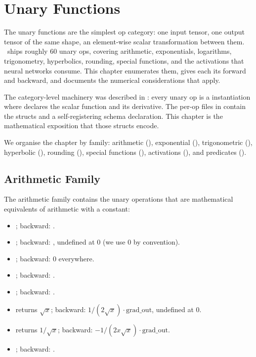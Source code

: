 \chapter{Unary Functions}
\label{ch:unary_functions}

The unary functions are the simplest op category: one input tensor,
one output tensor of the same shape, an element-wise scalar
transformation between them. \Lucid\ ships roughly 60 unary ops,
covering arithmetic, exponentials, logarithms, trigonometry,
hyperbolics, rounding, special functions, and the activations that
neural networks consume. This chapter enumerates them, gives each
its forward and backward, and documents the numerical
considerations that apply.

The category-level machinery was described in
: every unary op is a
 instantiation where  declares the
scalar function and its derivative. The per-op files in
 contain the  structs and a
self-registering schema declaration. This chapter is the
mathematical exposition that those structs encode.

We organise the chapter by family: arithmetic
(), exponential
(), trigonometric
(), hyperbolic
(), rounding
(), special functions
(), activations
(), and predicates
().

\section{Arithmetic Family}
\label{sec:unary_functions:arith}

The arithmetic family contains the unary operations that are
mathematical equivalents of arithmetic with a constant:

\begin{itemize}
  \item {}; backward: .
  \item {}; backward: , undefined at 0 (we use 0 by convention).
  \item {}; backward: 0 everywhere.
  \item {}; backward: .
  \item {}; backward: .
  \item {} returns $\sqrt{x}$; backward: $1/(2\sqrt{x})
    \cdot \text{grad\_out}$, undefined at 0.
  \item {} returns $1/\sqrt{x}$; backward:
    $-1/(2 x \sqrt{x}) \cdot \text{grad\_out}$.
  \item {}; backward: .
\end{itemize}

